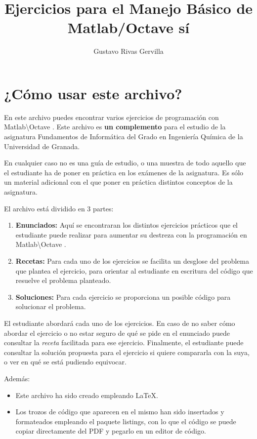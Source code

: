 \documentclass[spanish]{article}
\title{Ejercicios para el Manejo Básico de Matlab/Octave sí}
\author{Gustavo Rivas Gervilla}
\newcommand{\mt}{Matlab\textbackslash Octave }
\begin{document}
\maketitle

\newpage
\section*{¿Cómo usar este archivo?}

En este archivo puedes encontrar varios ejercicios de programación con \mt. Este archivo es \textbf{un complemento} para el estudio de la asignatura Fundamentos de Informática del Grado en Ingeniería Química de la Universidad de Granada.

En cualquier caso no es una guía de estudio, o una muestra de todo aquello que el estudiante ha de poner en práctica en los exámenes de la asignatura. Es sólo un material adicional con el que poner en práctica distintos conceptos de la asignatura.

El archivo está dividido en 3 partes:
\begin{enumerate}
\item \textbf{Enunciados:} Aquí se encontraran los distintos ejercicios prácticos que el estudiante puede realizar para aumentar su destreza con la programación en \mt.
\item \textbf{Recetas:} Para cada uno de los ejercicios se facilita un desglose del problema que plantea el ejercicio, para orientar al estudiante en escritura del código que resuelve el problema planteado.
\item \textbf{Soluciones:} Para cada ejercicio se proporciona un posible código para solucionar el problema.
\end{enumerate}

El estudiante abordará cada uno de los ejercicios. En caso de no saber cómo abordar el ejercicio o no estar seguro de qué se pide en el enunciado puede consultar la \textit{receta} facilitada para ese ejercicio. Finalmente, el estudiante puede consultar la solución propuesta para el ejercicio si quiere compararla con la suya, o ver en qué se está pudiendo equivocar.

Además:

\begin{itemize}
\item Este archivo ha sido creado empleando \LaTeX.
\item Los trozos de código que aparecen en el mismo han sido insertados y formateados empleando el paquete listings, con lo que el código se puede copiar directamente del PDF y pegarlo en un editor de código.
\end{itemize}
\newpage
\end{document}
